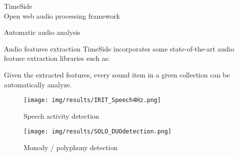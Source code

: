 \documentclass[final, hyperref, table]{beamer}
\begin{document}
\begin{frame}[containsverbatim]{}
\begin{columns}[T]
\begin{column}[T]{.5\linewidth}
\begin{block}{{\Large TimeSide}\\Open web audio processing framework}








\end{block}
\begin{block}{Automatic audio analysis}
  \begin{center}
    \begin{minipage}[h]{0.97\linewidth}
      \begin{beamerboxesrounded}%
        [shadow=true]%
        {Audio features extraction}
        TimeSide incorporates some state-of-the-art audio feature
        extraction libraries such as:


        Given the extracted features, every sound item in a given
        collection can be automatically analyze. 
      \end{beamerboxesrounded}

      \begin{center}
        \begin{figure}[h]
          \centering
          \texttt{[image: img/results/IRIT\_Speech4Hz.png]}
          \caption{Speech activity detection}
          \label{fig:TS_SAD}
        \end{figure}
        \begin{figure}[h]
          \centering
          \texttt{[image: img/results/SOLO\_DUOdetection.png]}
          \caption{Monody / polyphony detection}
          \label{fig:TS_Monopoly}
        \end{figure}


\end{center}
\end{minipage}
\end{center}
\end{block}
\end{column}
\end{columns}
\end{frame}
\end{document}
